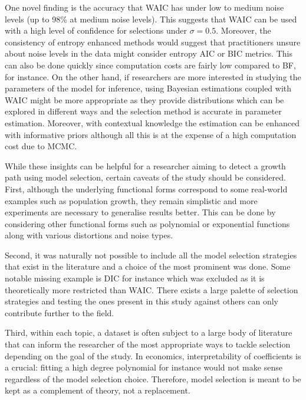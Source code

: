 \documentclass[12pt,]{article}
\begin{document}
One novel finding is the accuracy that WAIC has under low to medium noise levels (up to 98\% at medium noise levels). This suggests that WAIC can be used with a high level of confidence for selections under \(\sigma = 0.5\). Moreover, the consistency of entropy enhanced methods would suggest that practitioners unsure about noise levels in the data might consider entropy AIC or BIC metrics. This can also be done quickly since computation costs are fairly low compared to BF, for instance. On the other hand, if researchers are more interested in studying the parameters of the model for inference, using Bayesian estimations coupled with WAIC might be more appropriate as they provide distributions which can be explored in different ways and the selection method is accurate in parameter estimation. Moreover, with contextual knowledge the estimation can be enhanced with informative priors although all this is at the expense of a high computation cost due to MCMC.

While these insights can be helpful for a researcher aiming to detect a growth path using model selection, certain caveats of the study should be considered.
First, although the underlying functional forms correspond to some real-world examples such as population growth, they remain simplistic and more experiments are necessary to generalise results better. This can be done by considering other functional forms such as polynomial or exponential functions along with various distortions and noise types.

Second, it was naturally not possible to include all the model selection strategies that exist in the literature and a choice of the most prominent was done. Some notable missing example is DIC for instance which was excluded as it is theoretically more restricted than WAIC. There exists a large palette of selection strategies and testing the ones present in this study against others can only contribute further to the field.

Third, within each topic, a dataset is often subject to a large body of literature that can inform the researcher of the most appropriate ways to tackle selection depending on the goal of the study. In economics, interpretability of coefficients is a crucial: fitting a high degree polynomial for instance would not make sense regardless of the model selection choice. Therefore, model selection is meant to be kept as a complement of theory, not a replacement.
\end{document}
